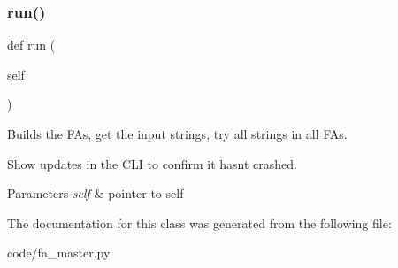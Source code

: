 \subsubsection{\texorpdfstring{run()}{run()}}
{\footnotesize\ttfamily def run (\begin{DoxyParamCaption}\item[{}]{self }\end{DoxyParamCaption})}



Builds the F\+As, get the input strings, try all strings in all F\+As. 

Show updates in the C\+LI to confirm it hasn\textquotesingle{}t crashed. 
\begin{DoxyParams}{Parameters}
{\em self} & pointer to self \\
\hline
\end{DoxyParams}


The documentation for this class was generated from the following file\+:\begin{DoxyCompactItemize}
\item 
code/fa\+\_\+master.\+py\end{DoxyCompactItemize}

